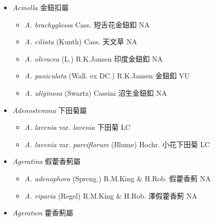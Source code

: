 
  \begin{itemize}
 \item[] \textit{Acmella} 金鈕扣屬
                                
  \begin{itemize}
        \item[] \textit{A. brachyglossa} Cass.  短舌花金鈕釦   NA
        \item[] \textit{A. ciliata} (Kunth) Cass.  天文草   NA
        \item[] \textit{A. oleracea} (L.) R.K.Jansen  印度金鈕釦   NA
        \item[] \textit{A. paniculata} (Wall. ex DC.) R.K.Jansen  金鈕釦   VU
        \item[] \textit{A. uliginosa} (Swartz) Cassini  沼生金鈕釦   NA
  \end{itemize}
 \item[] \textit{Adenostemma} 下田菊屬
                                
  \begin{itemize}
        \item[] \textit{A. lavenia} var. \textit{lavenia}   下田菊   LC
        \item[] \textit{A. lavenia} var. \textit{parviflorum} (Blume) Hochr.  小花下田菊   LC
  \end{itemize}
 \item[] \textit{Ageratina} 假藿香薊屬
                                
  \begin{itemize}
        \item[] \textit{A. adenophora} (Spreng.) R.M.King \& H.Rob.  假藿香薊   NA
        \item[] \textit{A. riparia} (Regel) R.M.King \& H.Rob.  澤假藿香薊   NA
  \end{itemize}
 \item[] \textit{Ageratum} 藿香薊屬
                                

\end{itemize}
